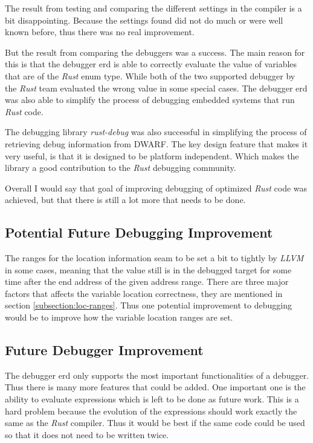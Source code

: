
The result from testing and comparing the different settings in the compiler is a bit disappointing.
Because the settings found did not do much or were well known before, thus there was no real improvement.


But the result from comparing the debuggers was a success.
The main reason for this is that the debugger \gls{erd} is able to correctly evaluate the value of variables that are of the \emph{Rust} enum type.
While both of the two supported debugger by the \emph{Rust} team evaluated the wrong value in some special cases.
The debugger \gls{erd} was also able to simplify the process of debugging embedded systems that run \emph{Rust} code.


The debugging library \emph{rust-debug} was also successful in simplifying the process of retrieving debug information from \gls{DWARF}.
The key design feature that makes it very useful, is that it is designed to be platform independent.
Which makes the library a good contribution to the \emph{Rust} debugging community.


Overall I would say that goal of improving debugging of optimized \emph{Rust} code was achieved, but that there is still a lot more that needs to be done.


\subsection{Potential Future Debugging Improvement}
The ranges for the location information seam to be set a bit to tightly by \emph{LLVM} in some cases, meaning that the value still is in the debugged target for some time after the end address of the given address range.
There are three major factors that affects the variable location correctness, they are mentioned in section \ref{subsection:loc-ranges}.
Thus one potential improvement to debugging would be to improve how the variable location ranges are set.


\subsection{Future Debugger Improvement}
The debugger \gls{erd} only supports the most important functionalities of a debugger.
Thus there is many more features that could be added.
One important one is the ability to evaluate expressions which is left to be done as future work.
This is a hard problem because the evolution of the expressions should work exactly the same as the \emph{Rust} compiler.
Thus it would be best if the same code could be used so that it does not need to be written twice.



